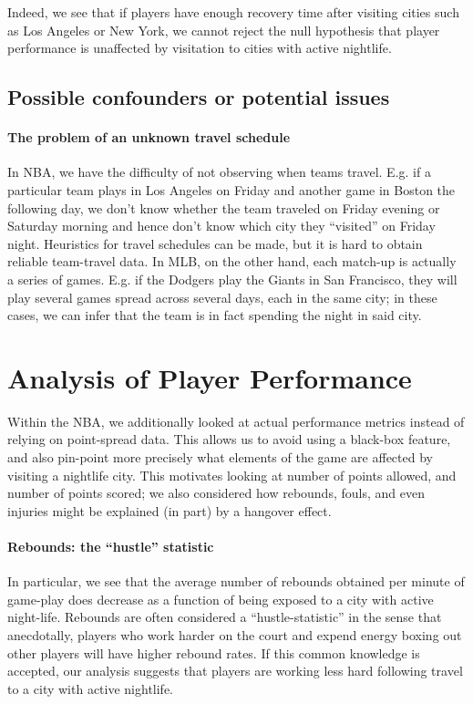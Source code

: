 \documentclass[letterpaper,12pt]{article}
\begin{document}
Indeed, we see that if players have enough recovery time after visiting cities such as Los
Angeles or New York, we cannot reject the null hypothesis that player performance is unaffected
by visitation to cities with active nightlife.


\subsection{Possible confounders or potential issues}

\paragraph{The problem of an unknown travel schedule} In NBA, we have the difficulty of not observing when teams travel. E.g. if a particular team  plays
in Los Angeles on Friday and another game in Boston the following day, we don't
know whether the team traveled on Friday evening or Saturday morning and hence don't know
which city they ``visited'' on Friday night. Heuristics for
travel schedules can be made, but it is hard to obtain reliable team-travel data.
In MLB, on the other hand, each match-up is actually a series of games. E.g.
if the Dodgers play the Giants in San Francisco, they will play several games spread
across several days, each in the same city; in these cases, we can infer that the team
is in fact spending the night in said city.


\section{Analysis of Player Performance}
Within the NBA, we additionally looked at actual performance metrics instead of relying on point-spread data. 
This allows us to avoid using a black-box feature, and also pin-point
more precisely what elements of the game are affected by visiting a nightlife city. This motivates looking at number of points allowed, and number of points scored; we also considered how rebounds, fouls, and even injuries might be 
explained (in part) by a hangover effect.

\paragraph{Rebounds: the ``hustle'' statistic}
In particular, we see that the average number of rebounds obtained per minute
of game-play does decrease as a function of being exposed to a city with active night-life. Rebounds are often considered a ``hustle-statistic'' in the sense 
that anecdotally, players who work harder on the court and expend energy boxing out
other players will have higher rebound rates. If this common knowledge is accepted,
our analysis suggests that players are working less hard following travel to a 
city with active nightlife.
\end{document}
